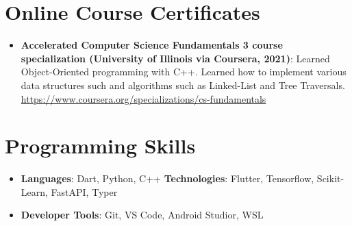 \documentclass[letterpaper,11pt]{article}
\newcommand{\resumeItem}[2]{
  \item\small{
    \textbf{#1}{: #2 \vspace{-2pt}}
  }
}
\newcommand{\resumeSubItem}[2]{\resumeItem{#1}{#2}\vspace{-4pt}}
\newcommand{\resumeSubHeadingListStart}{\begin{itemize}[leftmargin=*]}
\newcommand{\resumeSubHeadingListEnd}{\end{itemize}}
\begin{document}
%
\section{Online Course Certificates}
\resumeSubHeadingListStart
\resumeSubItem{Accelerated Computer Science Fundamentals 3 course specialization (University of Illinois via Coursera, 2021)} {Learned Object-Oriented programming with C++.
Learned how to implement various data structures such and algorithms such as Linked-List and Tree Traversals. \href{https://www.coursera.org/specializations/cs-fundamentals}{https://www.coursera.org/specializations/cs-fundamentals}}
\vspace{0.5mm}

\resumeSubHeadingListEnd

%

%
\section{Programming Skills}
 \resumeSubHeadingListStart
   \item{
     \textbf{Languages}{: Dart, Python, C++}
     \hfill
     \textbf{Technologies}{: Flutter, Tensorflow, Scikit-Learn, FastAPI, Typer}
   }
   \item{\textbf{Developer Tools}{: Git, VS Code, Android Studior, WSL}}
 \resumeSubHeadingListEnd


\end{document}
